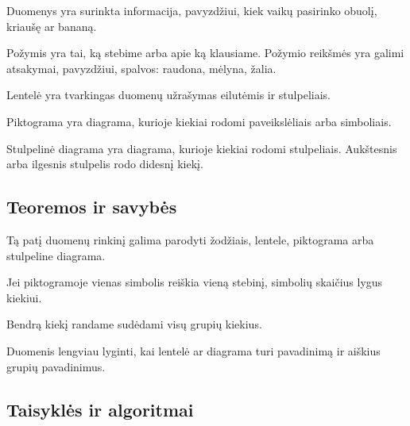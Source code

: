 \begin{apibreztis}
Duomenys yra surinkta informacija, pavyzdžiui, kiek vaikų pasirinko obuolį, kriaušę ar bananą.
\end{apibreztis}

\begin{apibreztis}
Požymis yra tai, ką stebime arba apie ką klausiame. Požymio reikšmės yra galimi atsakymai, pavyzdžiui, spalvos: raudona, mėlyna, žalia.
\end{apibreztis}

\begin{apibreztis}
Lentelė yra tvarkingas duomenų užrašymas eilutėmis ir stulpeliais.
\end{apibreztis}

\begin{apibreztis}
Piktograma yra diagrama, kurioje kiekiai rodomi paveikslėliais arba simboliais.
\end{apibreztis}

\begin{apibreztis}
Stulpelinė diagrama yra diagrama, kurioje kiekiai rodomi stulpeliais. Aukštesnis arba ilgesnis stulpelis rodo didesnį kiekį.
\end{apibreztis}

\subsection{Teoremos ir savybės}

\begin{savybe}
Tą patį duomenų rinkinį galima parodyti žodžiais, lentele, piktograma arba stulpeline diagrama.
\end{savybe}

\begin{savybe}
Jei piktogramoje vienas simbolis reiškia vieną stebinį, simbolių skaičius lygus kiekiui.
\end{savybe}

\begin{savybe}
Bendrą kiekį randame sudėdami visų grupių kiekius.
\end{savybe}

\begin{savybe}
Duomenis lengviau lyginti, kai lentelė ar diagrama turi pavadinimą ir aiškius grupių pavadinimus.
\end{savybe}

\subsection{Taisyklės ir algoritmai}

